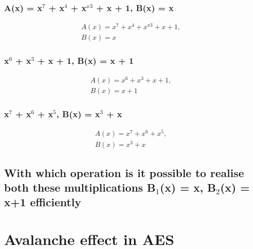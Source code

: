 \subsubsection{A(x) = x$^{7}$ + x$^{4}$ + x$^{x3}$ + x + 1, B(x) = x }
\label{section:3aa}
\begin{equation}
\begin{split}
A(x) = x^{7} + x^{4} + x^{x3} + x + 1, \\
B(x) = x 
\end{split}
\end{equation}

\subsubsection{x$^{6}$ + x$^{3}$ + x + 1, B(x) = x + 1}
\label{section:3ab}
\begin{equation}
\begin{split}
A(x) = x^{6} + x^{3} + x + 1,  \\
B(x) = x + 1 
\end{split}
\end{equation}

\subsubsection{x$^{7}$ + x$^{6}$ + x$^{5}$, B(x) = x$^{3}$ + x}
\label{section:3ac}
\begin{equation}
\begin{split}
A(x) = x^{7} + x^{6} + x^{5}, \\ 
B(x) = x^{3} + x
\end{split}
\end{equation}

\subsection{With which operation is it possible to realise both these multiplications B$_{1}$(x) = x, B$_{2}$(x) = x+1 efficiently}
\label{section:3b}

\section{Avalanche effect in AES}
\begin{comment}
W = ($w_{0};w_{1};w_{2};w_{3}$) = (0x00000000; 0x00100000; 0x00000000; 0x00000000)

K0 = (0x2B7E1516)
(0x28AED2A6)
(0xABF71588)
(0x09CF4F3C)

K1 = (0xA0FAFE17)
(0x88542CB1)
(0x23A33939)
(0x2A6C7605)
\end{comment}

